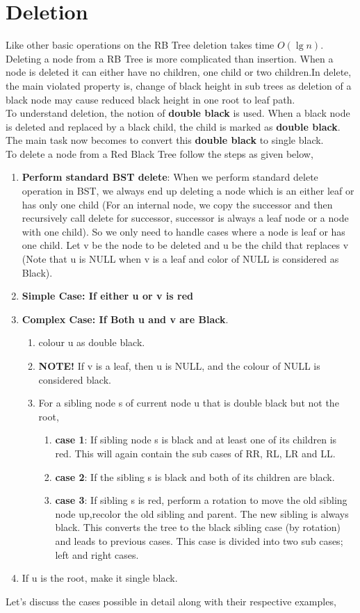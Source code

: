 \documentclass{article}
\begin{document}
\section{Deletion}
Like other basic operations on the RB Tree deletion takes time $O(\lg n)$. Deleting a node from a RB Tree is more complicated than insertion. When a node is deleted it can either have no children, one child or two children.In delete, the main violated property is, change of black height in sub trees as deletion of a black node may cause reduced black height in one root to leaf path.\\
To understand deletion, the notion of \textbf{double black} is used.  When a black node is deleted and replaced by a black child, the child is marked as \textbf{double black}. The main task now becomes to convert this \textbf{double black} to single black. \\
To delete a node from a Red Black Tree follow the steps as given below,
\begin{enumerate}
    \item \textbf{Perform standard BST delete}: When we perform standard delete operation in BST, we always end up deleting a node which is an either leaf or has only one child (For an internal node, we copy the successor and then recursively call delete for successor, successor is always a leaf node or a node with one child). So we only need to handle cases where a node is leaf or has one child. Let v be the node to be deleted and u be the child that replaces v (Note that u is NULL when v is a leaf and color of NULL is considered as Black).
    \item \textbf{Simple Case: If either u or v is red}
    \item \textbf{Complex Case: If Both u and v are Black}.
    \begin{enumerate}
        \item colour u as double black.
        \item \textbf{NOTE!} If v is a leaf, then u is NULL, and the colour of NULL is considered black.
        \item For a sibling node s of current node u that is double black but not the root,
        \begin{enumerate}
            \item \textbf{case 1}: If sibling node s is black and at least one of its children is red. This will again contain the sub cases of RR, RL, LR and LL. 
            \item \textbf{case 2}: If the sibling s is black and both of its children are black.
            \item \textbf{case 3}: If sibling s is red, perform a rotation to move the old sibling node up,recolor the old sibling and parent. The new sibling is always black. This converts the tree to the black sibling case (by rotation) and leads to previous cases. This case is divided into two sub cases; left and right cases.
        \end{enumerate}
    \end{enumerate}
    \item If u is the root, make it single black.
\end{enumerate}
Let's discuss the cases possible in detail along with their respective examples,
\end{document}
